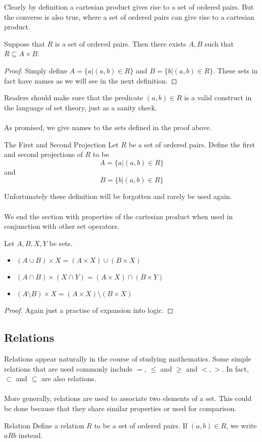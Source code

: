 Clearly by definition a cartesian product gives rise to a set of ordered pairs. But the converse is also true, where a set of ordered pairs can give rise to a cartesian product. 

\begin{prp}{}{} Suppose that $R$ is a set of ordered pairs. Then there exists $A,B$ such that $R\subseteq A\times B$. \tcbline
\begin{proof}
Simply define $A=\{a|(a,b)\in R\}$ and $B=\{b|(a,b)\in R\}$. These sets in fact have names as we will see in the next definition. 
\end{proof}
\end{prp}

Readers should make sure that the predicate $(a,b)\in R$ is a valid construct in the language of set theory, just as a sanity check. \\~\\
As promised, we give names to the sets defined in the proof above. 

\begin{defn}{The First and Second Projection}{} Let $R$ be a set of ordered pairs. Define the first and second projections of $R$ to be $$A=\{a|(a,b)\in R\}$$ and $$B=\{b|(a,b)\in R\}$$
\end{defn}

Unfortunately these definition will be forgotten and rarely be used again. \\~\\
We end the section with properties of the cartesian product when used in conjunction with other set operators. 

\begin{prp}{}{} Let $A,B,X,Y$ be sets. 
\begin{itemize}
\item $(A\cup B)\times X=(A\times X)\cup(B\times X)$
\item $(A\cap B)\times (X\cap Y)=(A\times X)\cap(B\times Y)$
\item $(A\setminus B)\times X=(A\times X)\setminus(B\times X)$
\end{itemize}\tcbline
\begin{proof} Again just a practise of expansion into logic. 
\end{proof}
\end{prp}

\subsection{Relations}
Relations appear naturally in the course of studying mathematics. Some simple relations that are used commonly include $=$, $\leq$ and $\geq$ and $<,>$. In fact, $\subset$ and $\subseteq$ are also relations. \\~\\
More generally, relations are used to associate two elements of a set. This could be done because that they share similar properties or used for comparison. 
\begin{defn}{Relation}{} Define a relation $R$ to be a set of ordered pairs. If $(a,b)\in R$, we write $aRb$ instead. 
\end{defn}

